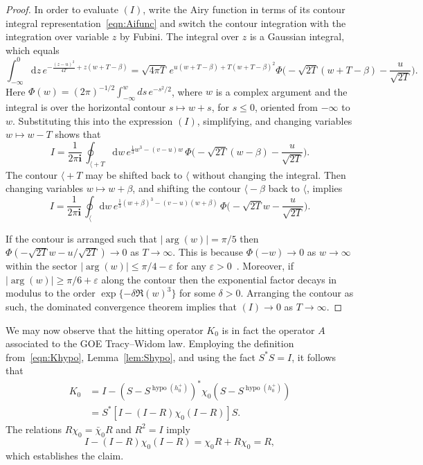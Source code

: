 \documentclass[10pt]{amsart}
\theoremstyle{definition}\newtheorem{defi}[theo]{Definition}\newtheorem{rema}[theo]{Remark}\newtheorem{exam}[theo]{Example}\newtheorem{exem}[theo]{Example}\newtheorem{nota}[theo]{Notation}
\newcommand*{\dd}{\mathrm{d}}
\newcommand*{\myangle}{\mathord{\langle}} %
\DeclareMathOperator{\hypo}{hypo}
\DeclareMathOperator{\argl}{arg}
\newcommand{\eps}{\varepsilon}
\begin{document}
\begin{proof}
In order to evaluate $(I)$, write the Airy function in terms of its contour integral representation~\eqref{eqn:Aifunc} and switch the contour integration with the integration over variable $z$ by Fubini. The integral over $z$ is a Gaussian integral, which equals
\begin{equation*}
\int_{-\infty}^0 \dd z \, e^{-\frac{(z-u)^2}{4T}+z(w+T-\beta)} =
\sqrt{4 \pi T} \, e^{ u(w+T-\beta) + T(w+T-\beta)^2} \Phi \Big(-\sqrt{2T}(w+T-\beta) - \frac{u}{\sqrt{2T}} \Big).
\end{equation*}
Here $\Phi(w) = (2 \pi)^{-1/2} \int_{-\infty}^w ds \,e^{- s^2/2}$, where $w$ is a complex argument and the integral is over the horizontal contour $s \mapsto w + s$, for $s \leq 0$, oriented from $-\infty$ to $w$. Substituting this into the expression $(I)$, simplifying, and changing variables $w \mapsto w-T$ shows that
\[
I = \frac{1}{2 \pi \mathbf{i}}\, \oint_{\myangle+T} \dd w\, e^{ \frac{1}{3}w^3 -(v-u)w}\,
\Phi \Big (-\sqrt{2T}(w-\beta) - \frac{u}{\sqrt{2T}} \Big).
\]
The contour $\myangle +T$ may be shifted back to $\myangle$ without changing the integral. Then changing variables $w \mapsto w + \beta$, and shifting the contour $\myangle - \beta$ back to $\myangle$, implies
\[
I = \frac{1}{2 \pi \mathbf{i}}\, \oint_{\myangle} \dd w\, e^{ \frac{1}{3}(w+\beta)^3 -(v-u)(w+\beta)}\,
\Phi \Big (-\sqrt{2T}w - \frac{u}{\sqrt{2T}} \Big).
\]

If the contour is arranged such that $| \argl(w)| = \pi/5$ then $\Phi(-\sqrt{2T}w - u / \sqrt{2T}) \to 0$ as $T \to \infty$. This is because $\Phi(-w) \to 0$ as $w \to \infty$ within the sector $\mathopen|\argl(w)|\leq \pi/4 - \eps$ for any $\eps > 0$~\cite[Eq.~7.2.4]{Nist}. Moreover, if $\mathopen|\argl(w)| \geq \pi/6 +\eps$ along the contour then the exponential factor decays in modulus to the order $\exp \{-\delta \Re(w)^3\}$ for some $\delta > 0$. Arranging the contour as such, the dominated convergence theorem implies that $(I) \to 0$ as $T \to \infty$.
\end{proof}

We may now observe that the hitting operator $K_0$ is in fact the operator $A$ associated to the GOE Tracy--Widom law. Employing the definition from~\eqref{eqn:Khypo}, Lemma~\ref{lem:Shypo}, and using the fact $S^{*}S = I$, it follows that
\begin{align*}
K_0 &= I - (S- S^{\hypo(h^{+}_0)})^{*} \chi_0 (S- S^{\hypo(h^{+}_0)}) \\
\nonumber &= S^{*} [I - (I-R)\chi_0(I-R)] S.
\end{align*}
The relations $R \chi_0 = \bar{\chi}_0 R$ and $R^2 = I$ imply
\[
I - (I-R)\chi_0(I-R) = \chi_0 R + R \chi_0 = R,
\]
which establishes the claim.
\end{document}
